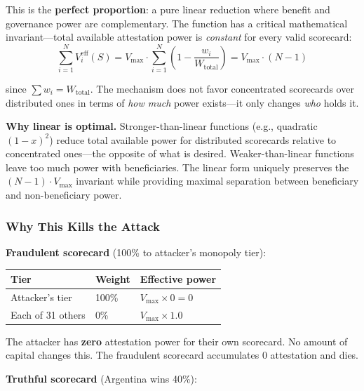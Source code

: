 \documentclass[11pt,a4paper]{article}
\begin{document}
This is the \textbf{perfect proportion}: a pure linear reduction where benefit and governance power are complementary. The function has a critical mathematical invariant---total available attestation power is \emph{constant} for every valid scorecard:
\begin{equation}
\sum_{i=1}^{N} V_i^{\text{eff}}(S)
  = V_{\text{max}} \cdot \sum_{i=1}^{N}\!\left(1 - \frac{w_i}{W_{\text{total}}}\right)
  = V_{\text{max}} \cdot (N - 1)
\end{equation}

since $\sum w_i = W_{\text{total}}$. The mechanism does not favor concentrated scorecards over distributed ones in terms of \emph{how much} power exists---it only changes \emph{who} holds it.

\textbf{Why linear is optimal.} Stronger-than-linear functions (e.g., quadratic $(1-x)^2$) reduce total available power for distributed scorecards relative to concentrated ones---the opposite of what is desired. Weaker-than-linear functions leave too much power with beneficiaries. The linear form uniquely preserves the $(N-1) \cdot V_{\text{max}}$ invariant while providing maximal separation between beneficiary and non-beneficiary power.

\subsubsection{Why This Kills the Attack}

\textbf{Fraudulent scorecard} (100\% to attacker's monopoly tier):

\begin{table}[H]
\centering
\begin{tabular}{lll}
\toprule
\textbf{Tier} & \textbf{Weight} & \textbf{Effective power} \\
\midrule
Attacker's tier & 100\% & $V_{\text{max}} \times 0 = 0$ \\
Each of 31 others & 0\% & $V_{\text{max}} \times 1.0$ \\
\bottomrule
\end{tabular}
\end{table}

The attacker has \textbf{zero} attestation power for their own scorecard. No amount of capital changes this. The fraudulent scorecard accumulates 0 attestation and dies.

\textbf{Truthful scorecard} (Argentina wins 40\%):
\end{document}
